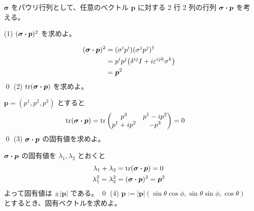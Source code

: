 \documentclass[uplatex,dvipdfmx,a4paper,11pt]{jlreq}
\makeatletter
\newcommand{\pp}{\bm{p}}
\theoremstyle{definition}
\renewenvironment{proof}[1][\proofname]{\par
  \normalfont
  \topsep6\p@\@plus6\p@ \trivlist
  \item[\hskip\labelsep{\bfseries #1}\@addpunct{\bfseries}]\ignorespaces\quad\par
}{%
  \qed\endtrivlist\@endpefalse
}
\renewcommand\proofname{証明}
\makeatother
\begin{document}
\begin{problem}
$\bm{\sigma}$ をパウリ行列として、任意のベクトル $\pp$ に対する 2 行 2 列の行列 $\bm{\sigma}\vdot\pp$ を考える。
\end{problem}
(1) $(\bm{\sigma}\vdot\pp)^2$ を求めよ。
\begin{proof}
  \begin{align}
    (\bm{\sigma}\vdot\pp)^2 & = (\sigma^ip^i)(\sigma^jp^j)^\dagger                    \\
                            & = p^ip^j\qty(\delta^{ij}I + i\varepsilon^{ijk}\sigma^k) \\
                            & = \pp^2
  \end{align}
\end{proof}
(2) $\trace(\bm{\sigma}\vdot\pp)$ を求めよ。
\begin{proof}
  $\pp = (p^1, p^2, p^3)$ とすると
  \begin{align}
    \trace(\bm{\sigma}\vdot\pp) & = \trace\begin{pmatrix}
                                            p^3        & p^1 - ip^2 \\
                                            p^1 + ip^2 & -p^3
                                          \end{pmatrix} = 0
  \end{align}
\end{proof}
(3) $\bm{\sigma}\vdot\pp$ の固有値を求めよ。
\begin{proof}
  $\bm{\sigma}\vdot\pp$ の固有値を $\lambda_1, \lambda_2$ とおくと
  \begin{align}
    \lambda_1 + \lambda_2     & = \trace(\bm{\sigma}\vdot\pp) = 0 \\
    \lambda_1^2 = \lambda_2^2 & = (\bm{\sigma}\vdot\pp)^2 = \pp^2
  \end{align}
  よって固有値は $\pm|\pp|$ である。
\end{proof}
(4) $\pp := |\pp|(\sin\theta\cos\phi, \sin\theta\sin\phi, \cos\theta)$ とするとき、固有ベクトルを求めよ。
\end{document}
